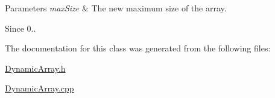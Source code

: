 \begin{DoxyParams}{Parameters}
{\em max\+Size} & The new maximum size of the array. \\
\hline
\end{DoxyParams}
\begin{DoxySince}{Since}
0.. 
\end{DoxySince}


The documentation for this class was generated from the following files\+:\begin{DoxyCompactItemize}
\item 
\hyperlink{DynamicArray_8h}{Dynamic\+Array.\+h}\item 
\hyperlink{DynamicArray_8cpp}{Dynamic\+Array.\+cpp}\end{DoxyCompactItemize}
